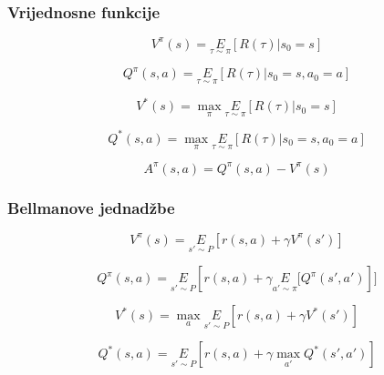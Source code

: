 \documentclass{beamer}
\begin{document}
\begin{frame}
	\frametitle{Vrijednosne funkcije}

	\begin{equation}
		\label{prva vrijednosna}
		V^{\pi}(s) = \underset{\tau \sim \pi}E[{R(\tau)\left| s_0 = s\right.}]
	\end{equation}

	\begin{equation}
		\label{druga vrijednosna}
		Q^{\pi}(s,a) = \underset{\tau \sim \pi}E[{R(\tau)\left| s_0 = s, a_0 = a\right.}]
	\end{equation}

	\begin{equation}
		\label{treća vrijednosna}
		V^*(s) = \max_{\pi} \underset{\tau \sim \pi}E[{R(\tau)\left| s_0 = s\right.}]
	\end{equation}

	\begin{equation}
		\label{četvrta vrijednosna}
		Q^*(s,a) = \max_{\pi} \underset{\tau \sim \pi}E[{R(\tau)\left| s_0 = s, a_0 = a\right.}]
	\end{equation}

	\begin{equation}
		A^{\pi}(s,a) = Q^{\pi}(s,a) - V^{\pi}(s)
	\end{equation}

\end{frame}

\begin{frame}
	\frametitle{Bellmanove jednadžbe}

	\begin{equation}
		\label{belman 1}
		V^{\pi}(s) = \underset{s'\sim P}E[{r(s,a) + \gamma V^{\pi}(s')}]
	\end{equation}

	\begin{equation}
		\label{belman 2}
		Q^{\pi}(s,a) = \underset{s'\sim P}E[{r(s,a) + \gamma \underset{a'\sim \pi}E[{Q^{\pi}(s',a')}}]]
	\end{equation}

	\begin{equation}
		\label{belman 3}
		V^*(s) = \max_a \underset{s'\sim P}E[{r(s,a) + \gamma V^*(s')}]
	\end{equation}

	\begin{equation}
		\label{belman 4}
		Q^*(s,a) = \underset{s'\sim P}E[{r(s,a) + \gamma \max_{a'} Q^*(s',a')}]
	\end{equation}

\end{frame}
\end{document}

